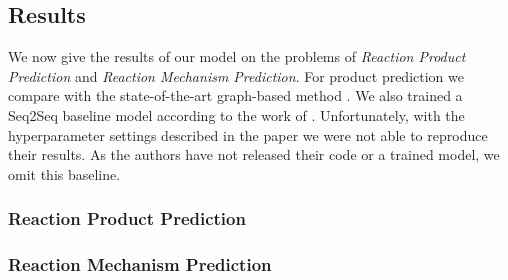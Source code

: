 \subsection{Results}
We now give the results of our model on the problems of \emph{Reaction Product Prediction} and \emph{Reaction Mechanism Prediction}. For product prediction we compare with the state-of-the-art graph-based method \cite{jin2017predicting}. We also trained a Seq2Seq baseline model according to the work of \cite{schwaller2017found}. Unfortunately, with the hyperparameter settings described in the paper we were not able to reproduce their results. As the authors have not released their code or a trained model, we omit this baseline.

\subsubsection*{Reaction Product Prediction}

\subsubsection*{Reaction Mechanism Prediction}

